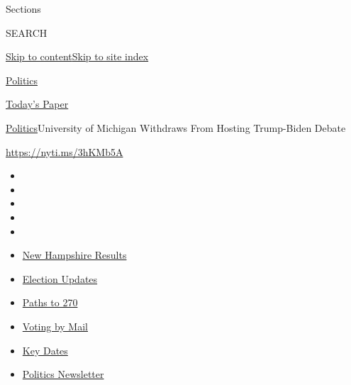Sections

SEARCH

\protect\hyperlink{site-content}{Skip to
content}\protect\hyperlink{site-index}{Skip to site index}

\href{https://www.nytimes3xbfgragh.onion/section/politics}{Politics}

\href{https://myaccount.nytimes3xbfgragh.onion/auth/login?response_type=cookie\&client_id=vi}{}

\href{https://www.nytimes3xbfgragh.onion/section/todayspaper}{Today's
Paper}

\href{/section/politics}{Politics}\textbar{}University of Michigan
Withdraws From Hosting Trump-Biden Debate

\url{https://nyti.ms/3hKMb5A}

\begin{itemize}
\item
\item
\item
\item
\item
\end{itemize}

\begin{itemize}
\item
  \href{https://www.nytimes3xbfgragh.onion/interactive/2020/09/08/us/elections/results-new-hampshire-primary-elections.html?action=click\&pgtype=Article\&state=default\&region=TOP_BANNER\&context=storylines_menu}{New
  Hampshire Results}
\item
  \href{https://www.nytimes3xbfgragh.onion/live/2020/09/09/us/trump-vs-biden?action=click\&pgtype=Article\&state=default\&region=TOP_BANNER\&context=storylines_menu}{Election
  Updates}
\item
  \href{https://www.nytimes3xbfgragh.onion/interactive/2020/us/elections/election-states-biden-trump.html?action=click\&pgtype=Article\&state=default\&region=TOP_BANNER\&context=storylines_menu}{Paths
  to 270}
\item
  \href{https://www.nytimes3xbfgragh.onion/interactive/2020/08/31/us/politics/vote-by-mail-deadlines.html?action=click\&pgtype=Article\&state=default\&region=TOP_BANNER\&context=storylines_menu}{Voting
  by Mail}
\item
  \href{https://www.nytimes3xbfgragh.onion/interactive/2019/us/elections/2020-presidential-election-calendar.html?action=click\&pgtype=Article\&state=default\&region=TOP_BANNER\&context=storylines_menu}{Key
  Dates}
\item
  \href{https://www.nytimes3xbfgragh.onion/newsletters/politics?action=click\&pgtype=Article\&state=default\&region=TOP_BANNER\&context=storylines_menu}{Politics
  Newsletter}
\end{itemize}

